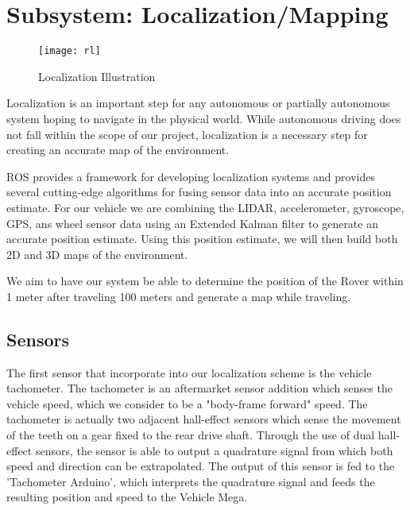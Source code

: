 \chapter{Subsystem: Localization/Mapping} \label{chap:Localization}


\begin{figure}[H]
	\centerline{\texttt{[image: rl]}}
	\caption[]{Localization Illustration \cite{clearpath}}
	\label{fig:robotlocalization}
\end{figure}

Localization is an important step for any autonomous or partially autonomous system hoping to navigate in the physical world. While autonomous driving does not fall within the scope of our project, localization is a necessary step for creating an accurate map of the environment. 

ROS provides a framework for developing localization systems and provides several cutting-edge algorithms for fusing sensor data into an accurate position estimate. For our vehicle we are combining the LIDAR, accelerometer, gyroscope, GPS, ans wheel sensor data using an Extended Kalman filter to generate an accurate position estimate. Using this position estimate, we will then build both 2D and 3D maps of the environment. 

We aim to have our system be able to determine the position of the Rover within 1 meter after traveling 100 meters and generate a map while traveling.

\section{Sensors}



The first sensor that incorporate into our localization scheme is the vehicle tachometer. The tachometer is an aftermarket sensor addition which senses the vehicle speed, which we consider to be a "body-frame forward" speed. The tachometer is actually two adjacent hall-effect sensors which sense the movement of the teeth on a gear fixed to the rear drive shaft. Through the use of dual hall-effect sensors, the sensor is able to output a quadrature signal from which both speed and direction can be extrapolated. The output of this sensor is fed to the 'Tachometer Arduino', which interprets the quadrature signal and feeds the resulting position and speed to the Vehicle Mega.

